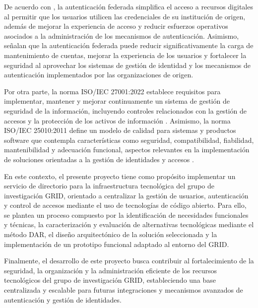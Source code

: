 De acuerdo con \citet{Felts2023}, la autenticación federada simplifica el acceso a recursos digitales al permitir que los usuarios utilicen las credenciales de su institución de origen, además de mejorar la experiencia de acceso y reducir esfuerzos operativos asociados a la administración de los mecanismos de autenticación. Asimismo, \citet{Prout2019} señalan que la autenticación federada puede reducir significativamente la carga de mantenimiento de cuentas, mejorar la experiencia de los usuarios y fortalecer la seguridad al aprovechar los sistemas de gestión de identidad y los mecanismos de autenticación implementados por las organizaciones de origen.

Por otra parte, la norma ISO/IEC 27001:2022 establece requisitos para implementar, mantener y mejorar continuamente un sistema de gestión de seguridad de la información, incluyendo controles relacionados con la gestión de accesos y la protección de los activos de información \citep{ISO27001}. Asimismo, la norma ISO/IEC 25010:2011 define un modelo de calidad para sistemas y productos software que contempla características como seguridad, compatibilidad, fiabilidad, mantenibilidad y adecuación funcional, aspectos relevantes en la implementación de soluciones orientadas a la gestión de identidades y accesos \citep{ISO25010}.

En este contexto, el presente proyecto tiene como propósito implementar un servicio de directorio para la infraestructura tecnológica del grupo de investigación \ac{GRID}, orientado a centralizar la gestión de usuarios, autenticación y control de accesos mediante el uso de tecnologías de código abierto. Para ello, se plantea un proceso compuesto por la identificación de necesidades funcionales y técnicas, la caracterización y evaluación de alternativas tecnológicas mediante el método \ac{DAR}, el diseño arquitectónico de la solución seleccionada y la implementación de un prototipo funcional adaptado al entorno del \ac{GRID}.

Finalmente, el desarrollo de este proyecto busca contribuir al fortalecimiento de la seguridad, la organización y la administración eficiente de los recursos tecnológicos del grupo de investigación \ac{GRID}, estableciendo una base centralizada y escalable para futuras integraciones y mecanismos avanzados de autenticación y gestión de identidades.
